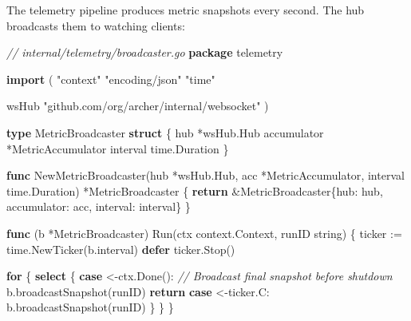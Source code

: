 \documentclass[
]{article}
\newenvironment{Shaded}{}{}
\newcommand{\CommentTok}[1]{\textcolor[rgb]{0.38,0.63,0.69}{\textit{#1}}}
\newcommand{\ControlFlowTok}[1]{\textcolor[rgb]{0.00,0.44,0.13}{\textbf{#1}}}
\newcommand{\DataTypeTok}[1]{\textcolor[rgb]{0.56,0.13,0.00}{#1}}
\newcommand{\KeywordTok}[1]{\textcolor[rgb]{0.00,0.44,0.13}{\textbf{#1}}}
\newcommand{\NormalTok}[1]{#1}
\newcommand{\OperatorTok}[1]{\textcolor[rgb]{0.40,0.40,0.40}{#1}}
\newcommand{\StringTok}[1]{\textcolor[rgb]{0.25,0.44,0.63}{#1}}
\begin{document}
The telemetry pipeline produces metric snapshots every second. The hub
broadcasts them to watching clients:

\begin{Shaded}
\begin{Highlighting}[]
\CommentTok{// internal/telemetry/broadcaster.go}
\KeywordTok{package}\NormalTok{ telemetry}

\KeywordTok{import} \OperatorTok{(}
    \StringTok{"context"}
    \StringTok{"encoding/json"}
    \StringTok{"time"}

\NormalTok{    wsHub }\StringTok{"github.com/org/archer/internal/websocket"}
\OperatorTok{)}

\KeywordTok{type}\NormalTok{ MetricBroadcaster }\KeywordTok{struct} \OperatorTok{\{}
\NormalTok{    hub         }\OperatorTok{*}\NormalTok{wsHub}\OperatorTok{.}\NormalTok{Hub}
\NormalTok{    accumulator }\OperatorTok{*}\NormalTok{MetricAccumulator}
\NormalTok{    interval    time}\OperatorTok{.}\NormalTok{Duration}
\OperatorTok{\}}

\KeywordTok{func}\NormalTok{ NewMetricBroadcaster}\OperatorTok{(}\NormalTok{hub }\OperatorTok{*}\NormalTok{wsHub}\OperatorTok{.}\NormalTok{Hub}\OperatorTok{,}\NormalTok{ acc }\OperatorTok{*}\NormalTok{MetricAccumulator}\OperatorTok{,}\NormalTok{ interval time}\OperatorTok{.}\NormalTok{Duration}\OperatorTok{)} \OperatorTok{*}\NormalTok{MetricBroadcaster }\OperatorTok{\{}
    \ControlFlowTok{return} \OperatorTok{\&}\NormalTok{MetricBroadcaster}\OperatorTok{\{}\NormalTok{hub}\OperatorTok{:}\NormalTok{ hub}\OperatorTok{,}\NormalTok{ accumulator}\OperatorTok{:}\NormalTok{ acc}\OperatorTok{,}\NormalTok{ interval}\OperatorTok{:}\NormalTok{ interval}\OperatorTok{\}}
\OperatorTok{\}}

\KeywordTok{func} \OperatorTok{(}\NormalTok{b }\OperatorTok{*}\NormalTok{MetricBroadcaster}\OperatorTok{)}\NormalTok{ Run}\OperatorTok{(}\NormalTok{ctx context}\OperatorTok{.}\NormalTok{Context}\OperatorTok{,}\NormalTok{ runID }\DataTypeTok{string}\OperatorTok{)} \OperatorTok{\{}
\NormalTok{    ticker }\OperatorTok{:=}\NormalTok{ time}\OperatorTok{.}\NormalTok{NewTicker}\OperatorTok{(}\NormalTok{b}\OperatorTok{.}\NormalTok{interval}\OperatorTok{)}
    \ControlFlowTok{defer}\NormalTok{ ticker}\OperatorTok{.}\NormalTok{Stop}\OperatorTok{()}

    \ControlFlowTok{for} \OperatorTok{\{}
        \ControlFlowTok{select} \OperatorTok{\{}
        \ControlFlowTok{case} \OperatorTok{\textless{}{-}}\NormalTok{ctx}\OperatorTok{.}\NormalTok{Done}\OperatorTok{():}
            \CommentTok{// Broadcast final snapshot before shutdown}
\NormalTok{            b}\OperatorTok{.}\NormalTok{broadcastSnapshot}\OperatorTok{(}\NormalTok{runID}\OperatorTok{)}
            \ControlFlowTok{return}
        \ControlFlowTok{case} \OperatorTok{\textless{}{-}}\NormalTok{ticker}\OperatorTok{.}\NormalTok{C}\OperatorTok{:}
\NormalTok{            b}\OperatorTok{.}\NormalTok{broadcastSnapshot}\OperatorTok{(}\NormalTok{runID}\OperatorTok{)}
        \OperatorTok{\}}
    \OperatorTok{\}}
\OperatorTok{\}}


\end{Highlighting}
\end{Shaded}
\end{document}
